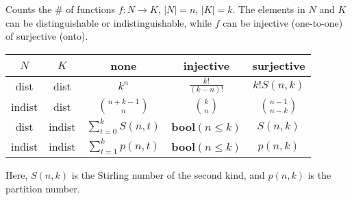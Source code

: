 Counts the \# of functions $f:N\rightarrow K$, $|N|=n$, $|K|=k$. The elements in $N$ and $K$ can be distinguishable or indistinguishable, while $f$ can be injective (one-to-one) of surjective (onto).
\begin{center}
\begin{tabular}{cc|ccc}
	$N$ & $K$ & none & injective & surjective\\
	\hline
	dist & dist & $k^n$ & $\frac{k!}{(k-n)!}$ & $k!S(n,k)$\\
	indist & dist & $\binom{n+k-1}{n}$ & $\binom{k}{n}$ & $\binom{n-1}{n-k}$\\
	dist & indist & $\sum_{t=0}^k S(n,t)$ & \textbf{bool}$(n\leq k)$ & $S(n,k)$\\
	indist & indist & $\sum_{t=1}^k p(n,t)$ & \textbf{bool}$(n\leq k)$ & $p(n,k)$\\
\end{tabular}
\end{center}
Here, $S(n,k)$ is the Stirling number of the second kind, and $p(n,k)$ is the partition number.
